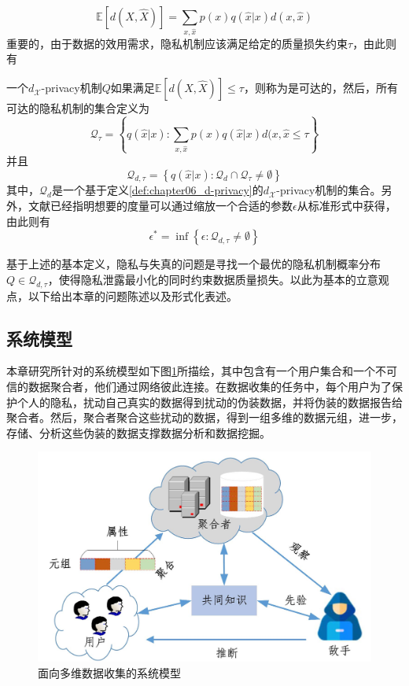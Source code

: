 \begin{equation}
\mathbb{E}[d(X,\hat{X})] = \sum_{x,\hat{x}}p(x) q(\hat{x}|x)d(x,\hat{x})
\end{equation}
重要的，由于数据的效用需求，隐私机制应该满足给定的质量损失约束$\tau$，由此则有

\begin{definition}
	一个$d_{\mathcal{X}}$-privacy机制$Q$如果满足$\mathbb{E}[d(X,\hat{X})] \leq \tau$，则称为是可达的，然后，所有可达的隐私机制的集合定义为
	\begin{equation}
		\mathcal{Q}_{\tau} = \left\{q(\hat{x}|x):\sum_{x,\hat{x}}p(x) q(\hat{x}|x)d(x,\hat{x} \leq \tau \right\}
	\end{equation}
并且
\begin{equation}
	\mathcal{Q}_{d,\tau}=\left \{q(\hat{x}|x):\mathcal{Q}_{d} \cap \mathcal{Q}_{\tau} \neq \emptyset \right\}
\end{equation}
其中，$\mathcal{Q}_d$是一个基于定义\textup{\ref{def:chapter06_d-privacy}}的$d_{\mathcal{X}}$-privacy机制的集合。另外，文献\textup{}已经指明想要的度量可以通过缩放一个合适的参数$\epsilon$从标准形式中获得，由此则有
\begin{equation}
\epsilon^* = \inf\left\{\epsilon: \mathcal{Q}_{d,\tau} \neq \emptyset \right\}
\end{equation}
\end{definition}

基于上述的基本定义，隐私与失真的问题是寻找一个最优的隐私机制概率分布$Q \in \mathcal{Q}_{d,\tau}$，使得隐私泄露最小化的同时约束数据质量损失。以此为基本的立意观点，以下给出本章的问题陈述以及形式化表述。

\subsection{系统模型}\label{subsec:system_model}
本章研究所针对的系统模型如下图\ref{fig:chapter06_Fig01}所描绘，其中包含有一个用户集合和一个不可信的数据聚合者，他们通过网络彼此连接。在数据收集的任务中，每个用户为了保护个人的隐私，扰动自己真实的数据得到扰动的伪装数据，并将伪装的数据报告给聚合者。然后，聚合者聚合这些扰动的数据，得到一组多维的数据元组，进一步，存储、分析这些伪装的数据支撑数据分析和数据挖掘。

\begin{figure}[htbp]
	\centering
	\includegraphics[width = 0.65\linewidth]{./figures/chapter06/chapter06_1.jpg}
	\caption{面向多维数据收集的系统模型}
	\label{fig:chapter06_Fig01}
\end{figure}


